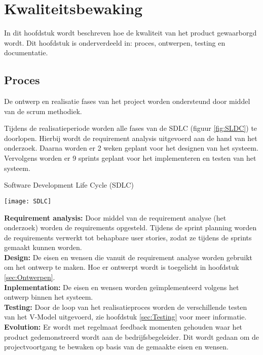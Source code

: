 \chapter{Kwaliteitsbewaking}
In dit hoofdstuk wordt beschreven hoe de kwaliteit van het product gewaarborgd wordt.
Dit hoofdstuk is onderverdeeld in: proces, ontwerpen, testing en documentatie.
\section{Proces}
De ontwerp en realisatie fases van het project worden ondersteund door middel van de scrum methodiek.

\whitespace[2]
Tijdens de realisatieperiode worden alle fases van de SDLC (figuur \ref{fig:SLDC}) te doorlopen.
Hierbij wordt de requirement analysis uitgevoerd aan de hand van het onderzoek.
Daarna worden er 2 weken geplant voor het designen van het systeem.
Vervolgens worden er 9 sprints geplant voor het implementeren en testen van het systeem. \\
\begin{graphic}
    \vspace{0.2cm}
    \captionsetup{type=figure}
    \caption{Software Development Life Cycle (SDLC)}
    \texttt{[image: SDLC]}
    \label{fig:SLDC}
    \vspace{0.2cm}
\end{graphic}
\textbf{Requirement analysis:} Door middel van de requirement analyse (het onderzoek) worden de requirements opgesteld.
Tijdens de sprint planning worden de requirements verwerkt tot behapbare user stories, zodat ze tijdens de sprints gemaakt kunnen worden.\\
\textbf{Design:} De eisen en wensen die vanuit de requirement analyse worden gebruikt om het ontwerp te maken.
Hoe er ontwerpt wordt is toegelicht in hoofdstuk \ref{sec:Ontwerpen}.\\
\textbf{Inplementation:}
De eisen en wensen worden geïmplementeerd volgens het ontwerp binnen het systeem.\\
\textbf{Testing:} Door de loop van het realisatieproces worden de verschillende testen van het V-Model uitgevoerd, zie hoofdstuk \ref{sec:Testing} voor meer informatie.\\
\textbf{Evolution:} Er wordt met regelmaat feedback momenten gehouden waar het product gedemonstreerd wordt aan de bedrijfsbegeleider.
Dit wordt gedaan om de projectvoortgang te bewaken op basis van de gemaakte eisen en wensen.
